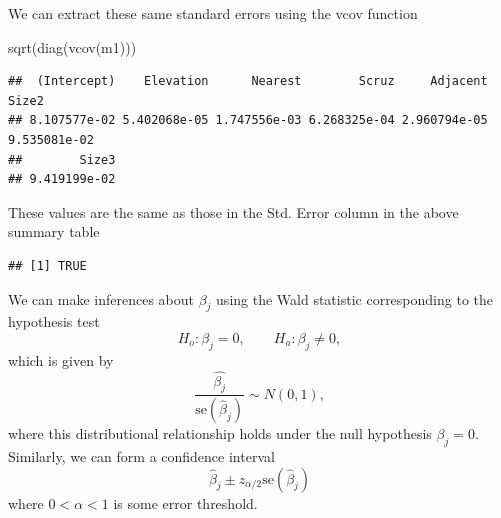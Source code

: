\documentclass[
  ignorenonframetext,
]{beamer}
\newenvironment{Shaded}{\begin{snugshade}}{\end{snugshade}}
\newcommand{\DecValTok}[1]{\textcolor[rgb]{0.00,0.00,0.81}{#1}}
\newcommand{\FunctionTok}[1]{\textcolor[rgb]{0.00,0.00,0.00}{#1}}
\newcommand{\NormalTok}[1]{#1}
\newcommand{\SpecialCharTok}[1]{\textcolor[rgb]{0.00,0.00,0.00}{#1}}
\begin{document}
\begin{frame}[fragile]{}
\protect\hypertarget{section-10}{}
We can extract these same standard errors using the vcov function

\vspace{12pt}
\tiny

\begin{Shaded}
\begin{Highlighting}[]
\FunctionTok{sqrt}\NormalTok{(}\FunctionTok{diag}\NormalTok{(}\FunctionTok{vcov}\NormalTok{(m1)))}
\end{Highlighting}
\end{Shaded}

\begin{verbatim}
##  (Intercept)    Elevation      Nearest        Scruz     Adjacent        Size2 
## 8.107577e-02 5.402068e-05 1.747556e-03 6.268325e-04 2.960794e-05 9.535081e-02 
##        Size3 
## 9.419199e-02
\end{verbatim}

\vspace{12pt}
\normalsize

These values are the same as those in the Std. Error column in the above
summary table

\vspace{12pt}
\tiny

\begin{Shaded}
\end{Shaded}

\begin{verbatim}
## [1] TRUE
\end{verbatim}
\end{frame}

\begin{frame}{}
\protect\hypertarget{section-11}{}
We can make inferences about \(\beta_j\) using the Wald statistic
corresponding to the hypothesis test \[
  H_o: \beta_j = 0, \qquad H_a:\beta_j \neq 0,
\] which is given by \[
  \frac{\hat{\beta_j}}{\text{se}(\hat\beta_j)} \sim N(0,1),
\] where this distributional relationship holds under the null
hypothesis \(\beta_j = 0\). Similarly, we can form a confidence interval
\[
  \hat\beta_j \pm z_{\alpha/2}\text{se}(\hat\beta_j)
\] where \(0 < \alpha < 1\) is some error threshold.
\end{frame}
\end{document}
